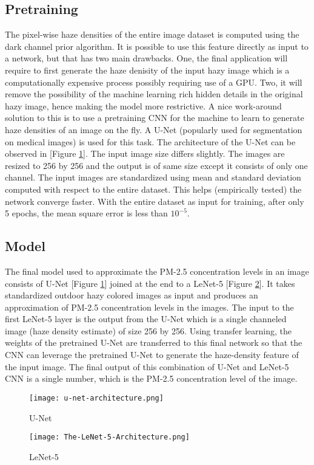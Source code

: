 \documentclass{article}
\begin{document}
\subsection{Pretraining}
The pixel-wise haze densities of the entire image dataset is computed using the dark channel prior algorithm. It is possible to use this feature directly as input to a network, but that has two main drawbacks. One, the final application will require to first generate the haze denisity of the input hazy image which is a computationally expensive process possibly requiring use of a GPU. Two, it will remove the possibility of the machine learning rich hidden details in the original hazy image, hence making the model more restrictive. A nice work-around solution to this is to use a pretraining CNN for the machine to learn to generate haze densities of an image on the fly. A U-Net (popularly used for segmentation on medical images) is used for this task. The architecture of the U-Net can be observed in [Figure \ref{U-Net}]. The input image size differs slightly. The images are resized to 256 by 256 and the output is of same size except it consists of only one channel. The input images are standardized using mean and standard deviation computed with respect to the entire dataset. This helps (empirically tested) the network converge faster. With the entire dataset as input for training, after only 5 epochs, the mean square error is less than $10^{-5}$.

\subsection{Model}

The final model used to approximate the PM-2.5 concentration levels in an image consists of U-Net [Figure \ref{U-Net}] joined at the end to a LeNet-5 [Figure \ref{LeNet-5}]. It takes standardized outdoor hazy colored images as input and produces an approximation of PM-2.5 concentration levels in the images. The input to the first LeNet-5 layer is the output from the U-Net which is a single channeled image (haze density estimate) of size 256 by 256. Using transfer learning, the weights of the pretrained U-Net are transferred to this final network so that the CNN can leverage the pretrained U-Net to generate the haze-density feature of the input image. The final output of this combination of U-Net and LeNet-5 CNN is a single number, which is the PM-2.5 concentration level of the image.

\begin{figure}[H]
  \centering
  \texttt{[image: u-net-architecture.png]}
  \caption{U-Net}
  \label{U-Net}
\end{figure}
\begin{figure}[H]
  \centering
  \texttt{[image: The-LeNet-5-Architecture.png]}
  \caption{LeNet-5}
  \label{LeNet-5}
\end{figure}
\end{document}
